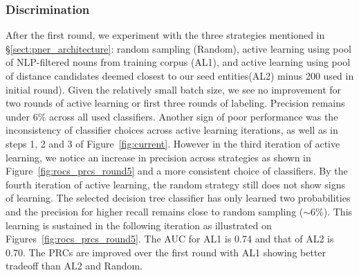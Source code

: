 \subsubsection{Discrimination}
After the first round, we experiment with the three strategies mentioned in \S\ref{sect:pner_architecture}: random sampling (Random), active learning using pool of NLP-filtered nouns from training corpus (AL1), and active learning using pool of  distance candidates deemed closest to our seed entities(AL2) \textemdash minus 200 used in initial round).
Given the relatively small batch size, we see no improvement for two rounds of active learning or first three rounds of labeling. 
Precision remains under 6\% across all used classifiers. 
Another sign of poor performance was the inconsistency of classifier choices across active learning iterations, 
as well as in steps 1, 2 and 3 of Figure~\ref{fig:current}.
However in the third iteration of active learning, we notice an increase in precision across strategies as shown in Figure~\ref{fig:rocs_prcs_round5} and a more consistent choice of classifiers.
By the fourth iteration of active learning, the random strategy still does not show signs of learning. 
The selected decision tree classifier has only learned two probabilities and the precision for higher recall remains close to random sampling ($\sim 6\%$).
This learning is sustained in the following iteration as illustrated on Figures~\ref{fig:rocs_prcs_round5}. 
The AUC for AL1 is 0.74 and that of AL2 is 0.70. The PRCs are improved over the first round with AL1 showing better tradeoff than AL2 and Random.



